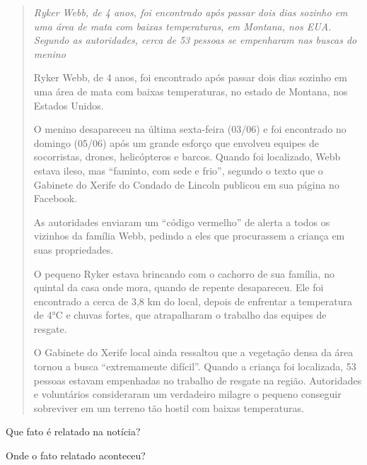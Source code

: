 \begin{escolha}
\begin{escolha}
\begin{quote}
\emph{Ryker Webb, de 4 anos, foi encontrado após passar dois dias
sozinho em uma área de mata com baixas temperaturas, em Montana, nos
EUA. Segundo as autoridades, cerca de 53 pessoas se empenharam nas
buscas do menino}

Ryker Webb, de 4 anos, foi encontrado após passar dois dias sozinho em
uma área de mata com baixas temperaturas, no estado de Montana, nos
Estados Unidos.

O menino desapareceu na última sexta-feira (03/06) e foi encontrado no
domingo (05/06) após um grande esforço que envolveu equipes de
socorristas, drones, helicópteros e barcos. Quando foi localizado, Webb
estava ileso, mas ``faminto, com sede e frio'', segundo o texto que o
Gabinete do Xerife do Condado de Lincoln publicou em sua página no
Facebook.

As autoridades enviaram um ``código vermelho'' de alerta a todos os
vizinhos da família Webb, pedindo a eles que procurassem a criança em
suas propriedades.

O pequeno Ryker estava brincando com o cachorro de sua família, no
quintal da casa onde mora, quando de repente desapareceu. Ele foi
encontrado a cerca de 3,8 km do local, depois de enfrentar a temperatura
de 4°C e chuvas fortes, que atrapalharam o trabalho das equipes de
resgate.

O Gabinete do Xerife local ainda ressaltou que a vegetação densa da área
tornou a busca ``extremamente difícil''. Quando a criança foi
localizada, 53 pessoas estavam empenhadas no trabalho
de resgate na
região. Autoridades e voluntários consideraram um verdadeiro milagre o
pequeno conseguir sobreviver em um terreno tão hostil com baixas
temperaturas.
\end{quote}


\begin{escolha}
\item Que fato é relatado na notícia?


\item Onde o fato relatado aconteceu?


\end{escolha}
\end{escolha}
\end{escolha}
